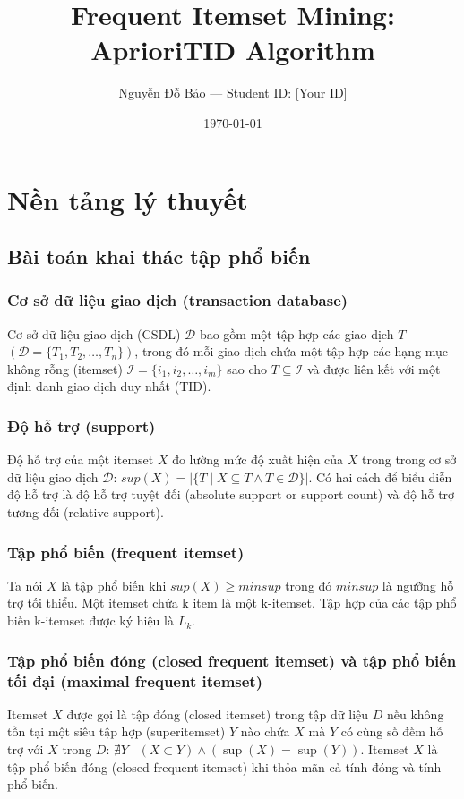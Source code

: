 \documentclass[12pt]{article}
\title{Frequent Itemset Mining: AprioriTID Algorithm}
\author{Nguyễn Đỗ Bảo --- Student ID: [Your ID]}
\date{\today}
\begin{document}
\maketitle %

\section{Nền tảng lý thuyết}
\label{sec:intro}
\subsection{Bài toán khai thác tập phổ biến}
\label{subsec:FIM}
\subsubsection{Cơ sở dữ liệu giao dịch (transaction database)}
Cơ sở dữ liệu giao dịch (CSDL) $\mathcal{D}$ bao gồm một tập hợp các giao dịch $T$ $(\mathcal{D} = \{T_1, T_2, \ldots, T_n\})$, trong đó mỗi giao dịch chứa một tập hợp các hạng mục không rỗng (itemset) $\mathcal{I} = \{i_1, i_2, \ldots, i_m\}$ sao cho $T \subseteq \mathcal{I}$ và được liên kết với một định danh giao dịch duy nhất (TID).

\subsubsection{Độ hỗ trợ (support)}
Độ hỗ trợ của một itemset $X$ đo lường mức độ xuất hiện của $X$ trong trong cơ sở dữ liệu giao dịch $\mathcal{D}$: $sup(X) = |\{T \mid X \subseteq T \land T \in \mathcal{D}\}|$. Có hai cách để biểu diễn độ hỗ trợ là độ hỗ trợ tuyệt đối (absolute support or support count) và độ hỗ trợ tương đối (relative support).

\subsubsection{Tập phổ biến (frequent itemset)}
Ta nói $X$ là tập phổ biến khi $sup(X) \geq minsup$ trong đó $minsup$ là ngưỡng hỗ trợ tối thiểu. Một itemset chứa k item là một k-itemset. Tập hợp của các tập phổ biến k-itemset được ký hiệu là $L_k$.

\subsubsection{Tập phổ biến đóng (closed frequent itemset) và tập phổ biến tối đại (maximal frequent itemset)}
Itemset $X$ được gọi là tập đóng (closed itemset) trong tập dữ liệu $D$ nếu không tồn tại một siêu tập hợp (superitemset) $Y$ nào chứa $X$ mà $Y$ có cùng số đếm hỗ trợ với $X$ trong $D$: $\nexists Y \mid (X \subset Y) \land (\sup(X) = \sup(Y))$. Itemset $X$ là tập phổ biến đóng (closed frequent itemset) khi thỏa mãn cả tính đóng và tính phổ biến.
\end{document}
